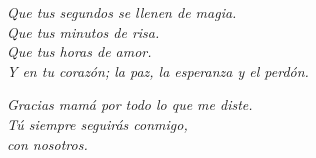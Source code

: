 \begin{flushright}
	\vspace{3cm}
	\textit{
    Que tus segundos se llenen de magia.\\
    Que tus minutos de risa.\\
    Que tus horas de amor.\\
    Y en tu corazón; la paz, la esperanza y el perdón.}\\
	\vspace{15mm}
	
	\textit{
    Gracias mamá por todo lo que me diste. \\ 
    Tú siempre seguirás conmigo,\\ 
    con nosotros. }
    	
\end{flushright}